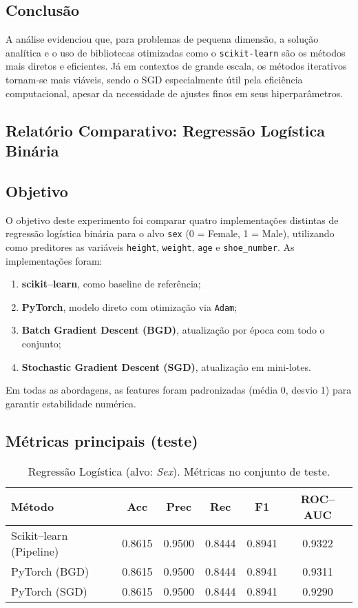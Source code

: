 \documentclass[a4paper]{article}
\begin{document}
\begin{answer}[Ítem 1.1]
\subsection*{Conclusão}
A análise evidenciou que, para problemas de pequena dimensão, a solução analítica e o uso de bibliotecas otimizadas como o \texttt{scikit-learn} são os métodos mais diretos e eficientes. Já em contextos de grande escala, os métodos iterativos tornam-se mais viáveis, sendo o SGD especialmente útil pela eficiência computacional, apesar da necessidade de ajustes finos em seus hiperparâmetros. 

    \end{answer}

    \begin{answer}[Ítem 1.2]
        \section*{Relatório Comparativo: Regressão Logística Binária}

\subsection*{Objetivo}
O objetivo deste experimento foi comparar quatro implementações distintas de regressão logística binária para o alvo \texttt{sex} (0 = Female, 1 = Male), utilizando como preditores as variáveis \texttt{height}, \texttt{weight}, \texttt{age} e \texttt{shoe\_number}. As implementações foram: 
\begin{enumerate}
    \item \textbf{scikit--learn}, como baseline de referência;
    \item \textbf{PyTorch}, modelo direto com otimização via \texttt{Adam};
    \item \textbf{Batch Gradient Descent (BGD)}, atualização por época com todo o conjunto;
    \item \textbf{Stochastic Gradient Descent (SGD)}, atualização em mini-lotes.
\end{enumerate}
Em todas as abordagens, as features foram padronizadas (média 0, desvio 1) para garantir estabilidade numérica.

\subsection*{Métricas principais (teste)}
\begin{table}[H]
\centering
\caption{Regressão Logística (alvo: \textit{Sex}). Métricas no conjunto de teste.}
\begin{tabular}{lccccc}
\toprule
Método & Acc & Prec & Rec & F1 & ROC--AUC \\
\midrule
Scikit--learn (Pipeline) & 0.8615 & 0.9500 & 0.8444 & 0.8941 & 0.9322 \\
PyTorch (BGD)            & 0.8615 & 0.9500 & 0.8444 & 0.8941 & 0.9311 \\
PyTorch (SGD)            & 0.8615 & 0.9500 & 0.8444 & 0.8941 & 0.9290 \\
\bottomrule
\end{tabular}
\end{table}

\end{answer}
\end{document}
